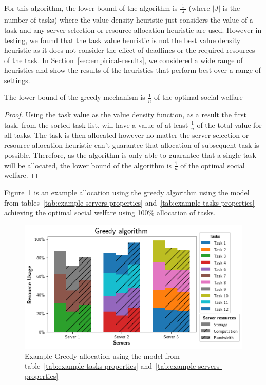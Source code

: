 For this algorithm, the lower bound of the algorithm is $\frac{1}{\left|J\right|}$ (where $\left|J\right|$ is the
number of tasks) where the value density heuristic just considers the value of a task and any server selection or
resource allocation heuristic are used. However in testing, we found that the task value heuristic is not the best
value density heuristic as it does not consider the effect of deadlines or the required resources of the task. In
Section~\ref{sec:empirical-results}, we considered a wide range of heuristics and show the results of the heuristics
that perform best over a range of settings.

\begin{theorem}
    The lower bound of the greedy mechanism is $\frac{1}{n}$ of the optimal social welfare
\end{theorem}
\begin{proof}
    Using the task value as the value density function, as a result the first task, from the sorted task list, will
    have a value of at least $\frac{1}{n}$ of the total value for all tasks. The task is then allocated however no
    matter the server selection or resource allocation heuristic can't guarantee that allocation of subsequent task is
    possible. Therefore, as the algorithm is only able to guarantee that a single task will be allocated, the lower
    bound of the algorithm is $\frac{1}{n}$ of the optimal social welfare.
\end{proof}

Figure~\ref{fig:greedy-allocation} is an example allocation using the greedy algorithm using the model from
tables~\ref{tab:example-servers-properties} and~\ref{tab:example-tasks-properties} achieving the optimal social
welfare using 100\% allocation of tasks. %

\begin{figure}[H]
    \includegraphics[width=\linewidth]{figs/allocation/greedy_algorithm.png}
    \caption{Example Greedy allocation using the model from table~\ref{tab:example-tasks-properties}
        and~\ref{tab:example-servers-properties}}
    \label{fig:greedy-allocation}
\end{figure}

